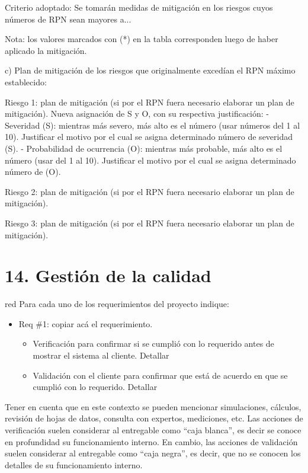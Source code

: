 \documentclass[
11pt, %
]{charter}
\begin{document}
Criterio adoptado: 
Se tomarán medidas de mitigación en los riesgos cuyos números de RPN sean mayores a...

Nota: los valores marcados con (*) en la tabla corresponden luego de haber aplicado la mitigación.

c) Plan de mitigación de los riesgos que originalmente excedían el RPN máximo establecido:
 
Riesgo 1: plan de mitigación (si por el RPN fuera necesario elaborar un plan de mitigación).
  Nueva asignación de S y O, con su respectiva justificación:
  - Severidad (S): mientras más severo, más alto es el número (usar números del 1 al 10).
          Justificar el motivo por el cual se asigna determinado número de severidad (S).
  - Probabilidad de ocurrencia (O): mientras más probable, más alto es el número (usar del 1 al 10).
          Justificar el motivo por el cual se asigna determinado número de (O).

Riesgo 2: plan de mitigación (si por el RPN fuera necesario elaborar un plan de mitigación).
 
Riesgo 3: plan de mitigación (si por el RPN fuera necesario elaborar un plan de mitigación).


\section{14. Gestión de la calidad}
\label{sec:calidad}

\begin{consigna}{red}
Para cada uno de los requerimientos del proyecto indique:
\begin{itemize} 
\item Req \#1: copiar acá el requerimiento.

\begin{itemize}
	\item Verificación para confirmar si se cumplió con lo requerido antes de mostrar el sistema al cliente. Detallar 
	\item Validación con el cliente para confirmar que está de acuerdo en que se cumplió con lo requerido. Detallar  
\end{itemize}

\end{itemize}

Tener en cuenta que en este contexto se pueden mencionar simulaciones, cálculos, revisión de hojas de datos, consulta con expertos, mediciones, etc.  Las acciones de verificación suelen considerar al entregable como ``caja blanca'', es decir se conoce en profundidad su funcionamiento interno.  En cambio, las acciones de validación suelen considerar al entregable como ``caja negra'', es decir, que no se conocen los detalles de su funcionamiento interno.

\end{consigna}
\end{document}

